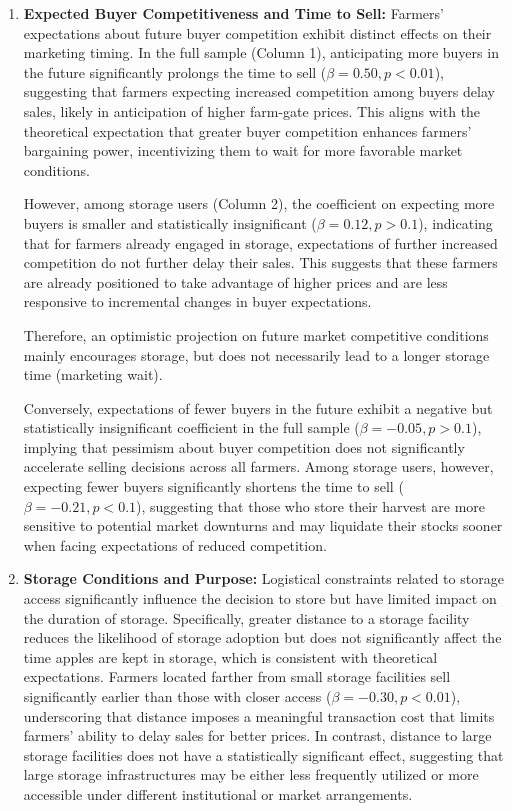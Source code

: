 \begin{enumerate}
    \item \textbf{Expected Buyer Competitiveness and Time to Sell:} Farmers' expectations about future buyer competition exhibit distinct effects on their marketing timing. In the full sample (Column 1), anticipating more buyers in the future significantly prolongs the time to sell (\(\beta = 0.50, p<0.01\)), suggesting that farmers expecting increased competition among buyers delay sales, likely in anticipation of higher farm-gate prices. This aligns with the theoretical expectation that greater buyer competition enhances farmers' bargaining power, incentivizing them to wait for more favorable market conditions.
    
    However, among storage users (Column 2), the coefficient on expecting more buyers is smaller and statistically insignificant (\(\beta = 0.12, p>0.1\)), indicating that for farmers already engaged in storage, expectations of further increased competition do not further delay their sales. This suggests that these farmers are already positioned to take advantage of higher prices and are less responsive to incremental changes in buyer expectations.

    Therefore, an optimistic projection on future market competitive conditions mainly encourages storage, but does not necessarily lead to a longer storage time (marketing wait).
    
    Conversely, expectations of fewer buyers in the future exhibit a negative but statistically insignificant coefficient in the full sample (\(\beta = -0.05, p>0.1\)), implying that pessimism about buyer competition does not significantly accelerate selling decisions across all farmers. Among storage users, however, expecting fewer buyers significantly shortens the time to sell (\(\beta = -0.21, p<0.1\)), suggesting that those who store their harvest are more sensitive to potential market downturns and may liquidate their stocks sooner when facing expectations of reduced competition.
    
    \item \textbf{Storage Conditions and Purpose:} 
    Logistical constraints related to storage access significantly influence the decision to store but have limited impact on the duration of storage. Specifically, greater distance to a storage facility reduces the likelihood of storage adoption but does not significantly affect the time apples are kept in storage, which is consistent with theoretical expectations. Farmers located farther from small storage facilities sell significantly earlier than those with closer access (\(\beta = -0.30, p<0.01\)), underscoring that distance imposes a meaningful transaction cost that limits farmers’ ability to delay sales for better prices. In contrast, distance to large storage facilities does not have a statistically significant effect, suggesting that large storage infrastructures may be either less frequently utilized or more accessible under different institutional or market arrangements.
    

\end{enumerate}
